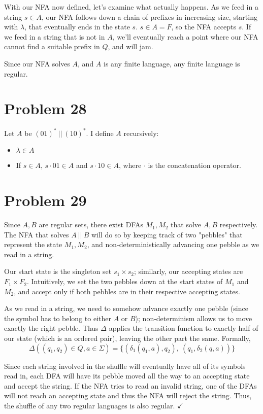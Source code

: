 \documentclass[11pt]{article}
\begin{document}
With our NFA now defined, let's examine what actually happens. As we feed in a string $s \in A$, our NFA follows down a chain of prefixes in increasing size, starting with $\lambda$, that eventually ends in the state $s$. $s \in A = F$, so the NFA accepts $s$. If we feed in a string that is not in $A$, we'll eventually reach a point where our NFA cannot find a suitable prefix in $Q$, and will jam.

Since our NFA solves $A$, and $A$ is any finite language, any finite language is regular.

\section*{Problem 28}

Let $A$ be $(01)^*\ ||\ (10)^*$. I define $A$ recursively:
	\begin{itemize}
		\item $\lambda \in A$
		\item If $s \in A$, $s \cdot 01 \in A$ and $s \cdot 10 \in A$, where $\cdot$ is the concatenation operator.
	\end{itemize}
	
\section*{Problem 29}
Since $A, B$ are regular sets, there exist DFAs $M_1, M_2$ that solve $A, B$ respectively. The NFA that solves $A\ ||\ B$ will do so by keeping track of two "pebbles" that represent the state $M_1, M_2$, and non-deterministically advancing one pebble as we read in a string.

Our start state is the singleton set $s_1 \times s_2$; similarly, our accepting states are $F_1 \times F_2$. Intuitively, we set the two pebbles down at the start states of $M_1$ and $M_2$, and accept only if both pebbles are in their respective accepting states.

As we read in a string, we need to somehow advance exactly one pebble (since the symbol has to belong to either $A$ or $B$); non-determinism allows us to move exactly the right pebble. Thus $\Delta$ applies the transition function to exactly half of our state (which is an ordered pair), leaving the other part the same. Formally,
	\[ \Delta( (q_1, q_2) \in Q, a \in \Sigma ) = \{ (\delta_1(q_1, a), q_2),\ (q_1, \delta_2(q,a)) \} \]
	
Since each string involved in the shuffle will eventually have all of its symbols read in, each DFA will have its pebble moved all the way to an accepting state and accept the string. If the NFA tries to read an invalid string, one of the DFAs will not reach an accepting state and thus the NFA will reject the string. Thus, the shuffle of any two regular languages is also regular. $\checkmark$
\end{document}
